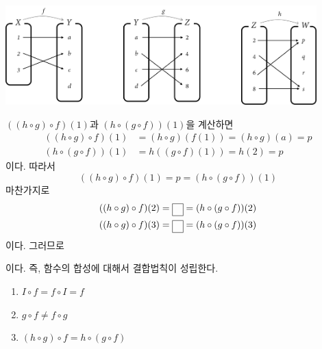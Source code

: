 \documentclass{oblivoir}
\begin{document}
\newpage
%
\label{composition8}
\begin{center}
\includegraphics[width=0.9\textwidth]{composition_8}
\end{center}
\(((h\circ g)\circ f)(1)\)과 \((h\circ (g\circ f))(1)\)을 계산하면
\begin{align*}
((h\circ g)\circ f)(1)&=(h\circ g)(f(1))=(h\circ g)(a)=p\\
(h\circ (g\circ f))(1)&=h((g\circ f)(1))=h(2)=p
\end{align*}
이다.
따라서
\[((h\circ g)\circ f)(1)=p=(h\circ (g\circ f))(1)\]
마찬가지로
\begin{gather*}
((h\circ g)\circ f)(2)=\pb p=(h\circ (g\circ f))(2)\\
((h\circ g)\circ f)(3)=\pb p=(h\circ (g\circ f))(3)
\end{gather*}
이다.
그러므로
\begin{center}
\end{center}
이다.
즉, 함수의 합성에 대해서 결합법칙이 성립한다.

\newpage
\begin{mdframed}
%
\begin{enumerate}[label=(\alph*)]\label{composition9}
\item
\(I\circ f=f\circ I=f\)
\item
\(g\circ f\neq f\circ g\)
\item
\((h\circ g)\circ f=h\circ(g\circ f)\)
\end{enumerate}
\end{mdframed}
\end{document}
